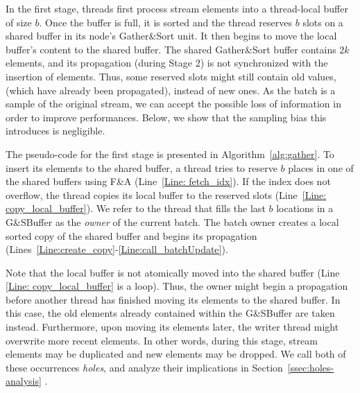 In the first stage, threads first process stream elements into a thread-local buffer of size $b$. Once the buffer is full, it is sorted and the thread reserves $b$ slots on a shared buffer in its node's Gather\&Sort unit. It then begins to move the local buffer's content to the shared buffer. The shared Gather\&Sort buffer contains $2k$ elements, and its propagation (during Stage 2) is not synchronized with the insertion of elements. Thus, some reserved slots might still contain old values, (which have already been propagated), instead of new ones. As the batch is a sample of the original stream, we can accept the possible loss of information in order to improve performances. Below, we show that the sampling bias this introduces is negligible.

The pseudo-code for the first stage is presented in Algorithm~\ref{alg:gather}. To insert its elements to the shared buffer, a thread tries to reserve $b$ places in one of the shared buffers using F\&A (Line~\ref{Line: fetch_idx}). If the index does not overflow, the thread copies its local buffer to the reserved slots (Line~\ref{Line: copy_local_buffer}). We refer to the thread that fills the last $b$ locations in a G\&SBuffer as the \emph{owner} of the current batch. The batch owner creates a local sorted copy of the shared buffer and begins its propagation (Lines~\ref{Line:create_copy}-\ref{Line:call_batchUpdate}).

Note that the local buffer is not atomically moved into the shared buffer (Line \ref{Line: copy_local_buffer} is a loop). Thus, the owner might begin a propagation before another thread has finished moving its elements to the shared buffer. In this case, the old elements already contained within the G\&SBuffer are taken instead. Furthermore, upon moving its elements later, the writer thread might overwrite more recent elements. In other words, during this stage, stream elements may be duplicated and new elements may be dropped. We call both of these occurrences \emph{holes}, and analyze their implications in Section~\ref{ssec:holes-analysis} .


